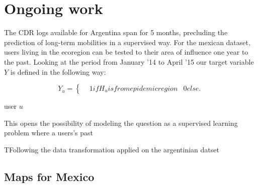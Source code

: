 \section{Ongoing work}

The CDR logs available for Argentina span for 5 months, precluding the prediction of long-term mobilities in a supervised way. For the mexican dataset, users living in the ecoregion can be tested to their area of influence one year to the past. Looking at the period from January '14 to April '15 our target variable $Y $ is defined in the following way: 

    \begin{equation}
    Y_u =
      \begin{cases}
        &1 if H_u is from epidemic region
        &0 else.
      \end{cases}
    \end{equation}

user $u$ 

This opens the possibility of modeling the question as a supervised learning problem where a users's past 

TFollowing the data transformation applied on the argentinian datset

\subsection{Maps for Mexico}